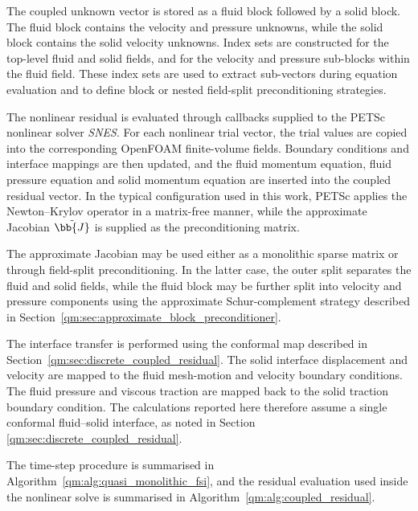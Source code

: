 The coupled unknown vector is stored as a fluid block followed by a solid
block. The fluid block contains the velocity and pressure unknowns, while the
solid block contains the solid velocity unknowns. Index sets are constructed
for the top-level fluid and solid fields, and for the velocity and pressure
sub-blocks within the fluid field. These index sets are used to extract
sub-vectors during equation evaluation and to define block or nested
field-split preconditioning strategies.

The nonlinear residual is evaluated through callbacks supplied to the PETSc nonlinear solver \emph{SNES}.
For each nonlinear trial vector, the trial values are copied into the corresponding OpenFOAM finite-volume fields.
Boundary conditions and interface mappings are then updated, and the fluid momentum equation, fluid pressure equation and
solid momentum equation are inserted into the coupled residual vector.
In the typical configuration used in this work, PETSc applies the Newton--Krylov operator in a matrix-free manner, while the approximate Jacobian
$\tilde{\bb{J}}$ is supplied as the preconditioning matrix.

The approximate Jacobian may be used either as a monolithic sparse matrix or through field-split preconditioning. In the latter case, the outer split
separates the fluid and solid fields, while the fluid block may be further
split into velocity and pressure components using the approximate Schur-complement strategy described in Section~\ref{qm:sec:approximate_block_preconditioner}.

The interface transfer is performed using the conformal map described in
Section~\ref{qm:sec:discrete_coupled_residual}. The solid interface displacement
and velocity are mapped to the fluid mesh-motion and velocity boundary conditions.
The fluid pressure and viscous traction are mapped back to the solid traction boundary condition.
The calculations reported here therefore assume a single conformal fluid--solid interface, as noted in Section \ref{qm:sec:discrete_coupled_residual}.

The time-step procedure is summarised in Algorithm~\ref{qm:alg:quasi_monolithic_fsi}, and the residual evaluation used inside the nonlinear solve is summarised in Algorithm~\ref{qm:alg:coupled_residual}.


